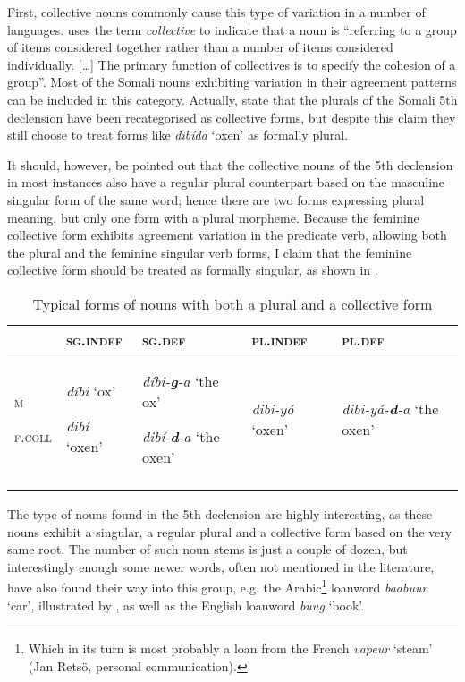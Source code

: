 \documentclass[output=paper]{langsci/langscibook}
\begin{document}
First, collective nouns commonly cause this type of variation in a number of languages. \citet[118–119]{Corbett2000} uses the term \textit{collective} to indicate that a noun is “referring to a group of items considered together rather than a number of items considered individually. […] The primary function of collectives is to specify the cohesion of a group”. Most of the Somali nouns exhibiting variation in their agreement patterns can be included in this category. Actually,   \citet[82]{PuglielliSiyaad1984} state that the plurals of the Somali 5th declension have been recategorised as collective forms, but despite this claim they still choose to treat forms like \textit{dibída} ‘oxen’ as formally plural.

It should, however, be pointed out that the collective nouns of the 5th declension in most instances also have a regular plural counterpart based on the masculine singular form of the same word; hence there are two forms expressing plural meaning, but only one form with a plural morpheme. Because the feminine collective form exhibits agreement variation in the predicate verb, allowing both the plural and the feminine singular verb forms, I claim that the feminine collective form should be treated as formally singular, as shown in .
 
\begin{table}
\caption{Typical forms of nouns with both a plural and a collective form}
\label{tab:9}

\begin{tabularx}{\textwidth}{XXXXX} 
\lsptoprule
& {\textsc{sg.indef}} & {\textsc{sg.def}} & {\textsc{pl.indef}} & {\textsc{pl.def}}\\
\midrule
{\textsc{m}}

{\textsc{f.coll}} 
& 
{\textit{díbi}  ‘ox’}

{\textit{dibí}  ‘oxen’} 
&
{\textit{díbi-}\textbf{\textit{g}}\textit{-a}  ‘the ox’} 

{\textit{dibí-}\textbf{\textit{d}}\textit{-a}  ‘the oxen’} 
&
{\textit{dibi-yó}  ‘oxen’} 
& {\textit{dibi-yá-}\textbf{\textit{d}}\textit{-a}  ‘the oxen’}\\
\lspbottomrule
\end{tabularx}
\end{table} 


The type of nouns found in the 5th declension are highly interesting, as these nouns exhibit a singular, a regular plural and a collective form based on the very same root. The number of such noun stems is just a couple of dozen, but interestingly enough some newer words, often not mentioned in the literature, have also found their way into this group, e.g. the Arabic\footnote{Which in its turn is most probably a loan from the French \textit{vapeur} ‘steam’ (Jan Retsö, personal communication).} loanword \textit{baabuur} ‘car’, illustrated by , as well as the English loanword \textit{buug} ‘book’.
\end{document}
